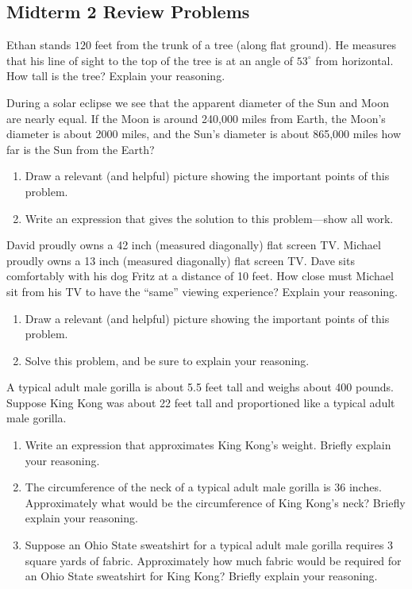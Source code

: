 \subsection{Midterm 2 Review Problems}

\begin{prob}
Ethan stands $120$ feet from the trunk of a tree (along flat ground).  He measures that his line of sight to the top of the tree is at an angle of $53^\circ$ from horizontal.  How tall is the tree?  Explain your reasoning.  
\end{prob}

\begin{prob}
During a solar eclipse we see that the apparent diameter of the Sun and Moon are nearly equal. If the Moon is around 240,000 miles from Earth, the Moon's diameter is about 2000 miles, and the Sun's diameter is about 865,000 miles how far is the Sun from the Earth?
\begin{enumerate}
\item Draw a relevant (and helpful) picture showing the important points of this problem.
\item Write an expression that gives the solution to this problem---show all work.
\end{enumerate}
\end{prob}

\begin{prob}
David proudly owns a 42 inch (measured diagonally) flat screen
  TV. Michael proudly owns a 13 inch (measured diagonally) flat screen
  TV. Dave sits comfortably with his dog Fritz at a distance of 10
  feet. How close must Michael sit from his TV to have the ``same''
  viewing experience?  Explain your reasoning.
\begin{enumerate}
\item Draw a relevant (and helpful) picture showing the important
  points of this problem.
\item Solve this problem, and be sure to explain your reasoning.
\end{enumerate}
\end{prob}

\begin{prob}
A typical adult male gorilla is about 5.5 feet tall and weighs about 400 pounds. Suppose King Kong was about 22 feet tall and proportioned like a typical adult male gorilla.
\begin{enumerate}
\item Write an expression that approximates King Kong's weight. Briefly explain your reasoning.
\item The circumference of the neck of a typical adult male gorilla is 36 inches. Approximately what would be the circumference of King Kong's neck? Briefly explain your reasoning.
\item Suppose an Ohio State sweatshirt for a typical adult male gorilla requires 3 square yards of fabric.  Approximately how much fabric would be required for an Ohio State sweatshirt for King Kong?  Briefly explain your reasoning.
\end{enumerate}
\end{prob}

